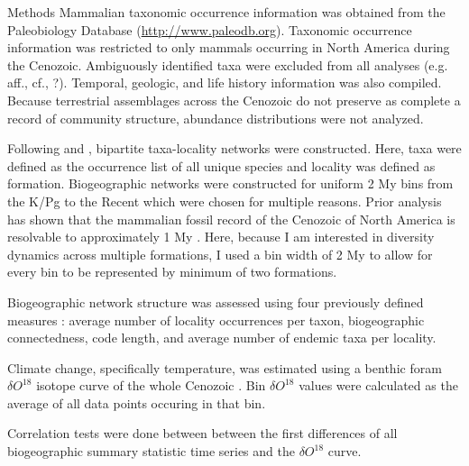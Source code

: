 \documentclass[final]{beamer}\usepackage[]{graphicx}\usepackage[]{color}
\newlength{\onecolwid}
\begin{document}
\begin{frame}[t]
\begin{columns}[t]
\begin{column}{\onecolwid}
      \begin{footnotesize}
      \begin{block}{Methods}
        Mammalian taxonomic occurrence information was obtained from the Paleobiology Database (\url{http://www.paleodb.org}). Taxonomic occurrence information was restricted to only mammals occurring in North America during the Cenozoic. Ambiguously identified taxa were excluded from all analyses (e.g. aff., cf., ?). Temporal, geologic, and life history information was also compiled. Because terrestrial assemblages across the Cenozoic do not preserve as complete a record of community structure, abundance distributions were not analyzed.

        Following \citet{Sidor2013} and \citet{Vilhena2013}, bipartite taxa-locality networks were constructed. Here, taxa were defined as the occurrence list of all unique species and locality was defined as formation. Biogeographic networks were constructed for uniform 2 My bins from the K/Pg to the Recent which were chosen for multiple reasons. Prior analysis has shown that the mammalian fossil record of the Cenozoic of North America is resolvable to approximately 1 My \citep{Alroy1996a,Alroy2000g}. Here, because I am interested in diversity dynamics across multiple formations, I used a bin width of 2 My to allow for every bin to be represented by minimum of two formations.

        Biogeographic network structure was assessed using four previously defined measures \citep{Sidor2013}: average number of locality occurrences per taxon, biogeographic connectedness, code length, and average number of endemic taxa per locality. 

        Climate change, specifically temperature, was estimated using a benthic foram \(\delta O^{18}\) isotope curve of the whole Cenozoic \citep{Zachos2008}. Bin \(\delta O^{18}\) values were calculated as the average of all data points occuring in that bin.

        Correlation tests were done between between the first differences of all biogeographic summary statistic time series and the \(\delta O^{18}\) curve. 

      \end{block}
      \end{footnotesize}

    \end{column}


\end{columns}
\end{frame}
\end{document}
